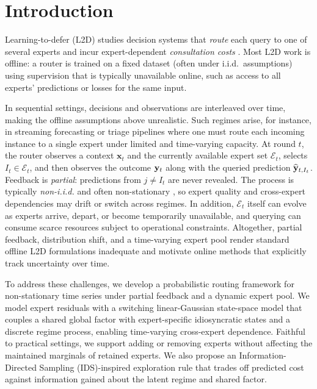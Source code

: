 \section{Introduction}

Learning-to-defer (L2D) studies decision systems that \emph{route} each query to one of several experts and incur expert-dependent
\emph{consultation costs} \citep{madras2018predict,mozannar2021consistent,Narasimhan,mao2023twostage, montreuil2025ask}.
Most L2D work is offline: a router is trained on a fixed dataset (often under i.i.d.\ assumptions) using supervision that is typically unavailable online,
such as access to all experts' predictions or losses for the same input.


In sequential settings, decisions and observations are interleaved over time, making the offline assumptions above unrealistic.
Such regimes arise, for instance, in streaming forecasting or triage pipelines where one must route each incoming instance to a single expert under limited and time-varying capacity.
At round $t$, the router observes a context $\mathbf{x}_t$ and the currently available expert set $\mathcal{E}_t$, selects $I_t \in \mathcal{E}_t$, and then observes the outcome $\mathbf{y}_t$ along with the queried prediction $\widehat{\mathbf{y}}_{t,I_t}$.
Feedback is \emph{partial}: predictions from $j\neq I_t$ are never revealed.
The process is typically \emph{non-i.i.d.} and often non-stationary \citep{hamilton2020time, sezer2020financial}, so expert quality and cross-expert dependencies may drift or switch across regimes.
In addition, $\mathcal{E}_t$ itself can evolve as experts arrive, depart, or become temporarily unavailable, and querying can consume scarce resources subject to operational constraints.
Altogether, partial feedback, distribution shift, and a time-varying expert pool render standard offline L2D formulations inadequate and motivate online methods that explicitly track uncertainty over time.



To address these challenges, we develop a probabilistic routing framework for non-stationary time series
under partial feedback and a dynamic expert pool.
We model expert residuals with a switching linear-Gaussian state-space
\citep{ghahramani2000variational, linderman2016recurrent, hu2024modeling} model
that couples a shared global factor with
expert-specific idiosyncratic states and a discrete regime process, enabling time-varying cross-expert dependence.
Faithful to practical settings, we support adding or removing experts without affecting the maintained marginals of retained experts.
We also propose an Information-Directed Sampling (IDS)-inspired exploration rule \citep{russo2014learning} that trades off predicted cost against information gained about the latent regime and shared factor.

